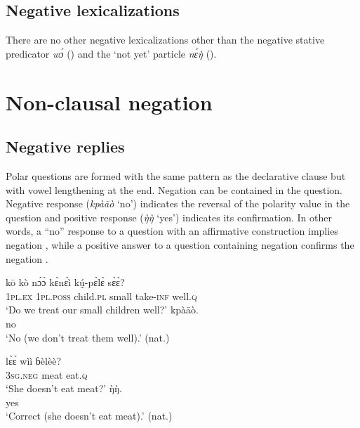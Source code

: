 \documentclass[output=paper,colorlinks,citecolor=brown]{langscibook}
\begin{document}
\clearpage


\subsection{Negative lexicalizations}\label{sec:mano:2.5}

There are no other negative lexicalizations other than the negative stative predicator \textit{wɔ́} () and the ‘not yet’ particle \textit{nɛ́ŋ̀} (). 

\section{Non-clausal negation}\label{sec:mano:3}
\subsection{Negative replies}\label{sec:mano:3.1}

Polar questions are formed with the same pattern as the declarative clause but with vowel lengthening at the end. Negation can be contained in the question. Negative response (\textit{kpàāò} ‘no’) indicates the reversal of the polarity value in the question and positive response (\textit{\`{ŋ}\`{ŋ}} ‘yes’) indicates its confirmation. In other words, a “no” response to a question with an affirmative construction implies negation , while a positive answer to a question containing negation confirms the negation .

\ea\label{ex:mano:71}
    \begin{xlist}
    \label{ex:mano:71:a}
        \gll kō kò nɔ́ɔ̀ kɛ̀nɛ́ì kṵ́-pɛ̀lɛ̀ sɛ̀ɛ̀? \\
         \textsc{1pl.ex} \textsc{1pl.poss} child.\textsc{pl} small take-\textsc{inf} well.\textsc{q}  \\
        \glt ‘Do we treat our small children well?’ 
    \label{ex:mano:71:b}
        \gll  kpàāò. \\ 
              no \\
        \glt ‘No (we don’t treat them well).’ (nat.)
    \end{xlist}
\z 

\ea\label{ex:mano:72}
    \begin{xlist}
    \label{ex:mano:72:a}
         \gll lɛ̀ɛ́ wìì ɓèlèè? \\
         \textsc{3sg.neg} meat eat.\textsc{q} \\
    \glt ‘She doesn’t eat meat?’ 
    \label{ex:mano:72:b}
        \gll ŋ̀ŋ̀. \\ 
             yes \\
        \glt ‘Correct (she doesn’t eat meat).’ (nat.)
    \end{xlist}
\z 
\end{document}
